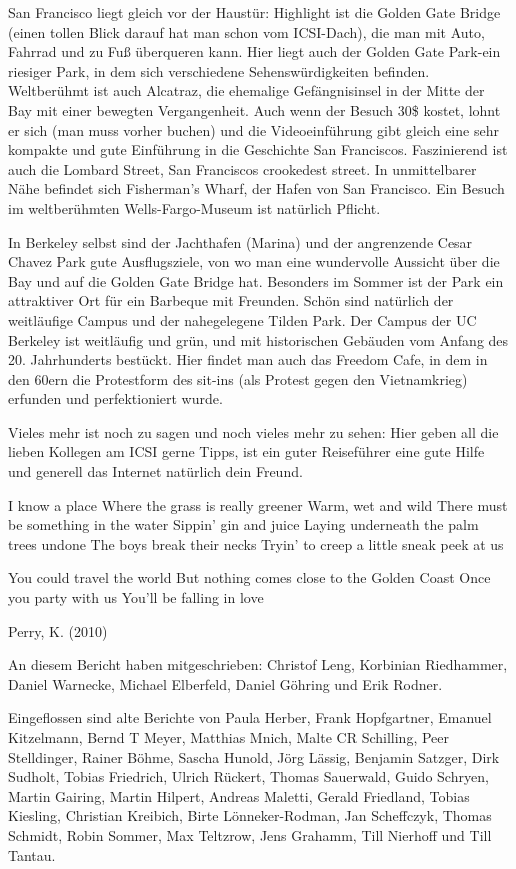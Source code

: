 \documentclass[a4paper]{scrreprt}
\begin{document}
San Francisco liegt gleich vor der Haustür: Highlight ist die Golden Gate Bridge (einen tollen Blick darauf hat man schon vom ICSI-Dach), die man mit Auto, Fahrrad und zu Fuß überqueren kann. Hier liegt auch der Golden Gate Park-ein riesiger Park, in dem sich verschiedene Sehenswürdigkeiten befinden. Weltberühmt ist auch Alcatraz, die ehemalige Gefängnisinsel in der Mitte der Bay mit einer bewegten Vergangenheit. Auch wenn der Besuch 30\$ kostet, lohnt er sich (man muss vorher buchen) und die Videoeinführung gibt gleich eine sehr kompakte und gute Einführung in die Geschichte San Franciscos. Faszinierend ist auch die Lombard Street, San Franciscos crookedest street. In unmittelbarer Nähe befindet sich Fisherman's Wharf, der Hafen von San Francisco. Ein Besuch im weltberühmten Wells-Fargo-Museum ist natürlich Pflicht.

In Berkeley selbst sind der Jachthafen (Marina) und der angrenzende Cesar Chavez Park gute Ausflugsziele, von wo man eine wundervolle Aussicht über die Bay und auf die Golden Gate Bridge hat. Besonders im Sommer ist der Park ein attraktiver Ort für ein Barbeque mit Freunden. Schön sind natürlich der weitläufige Campus und der nahegelegene Tilden Park. Der Campus der UC Berkeley ist weitläufig und grün, und mit historischen Gebäuden vom Anfang des 20. Jahrhunderts bestückt. Hier findet man auch das Freedom Cafe, in dem in den 60ern die Protestform des sit-ins (als Protest gegen den Vietnamkrieg) erfunden und perfektioniert wurde.

Vieles mehr ist noch zu sagen und noch vieles mehr zu sehen: Hier geben all die lieben Kollegen am ICSI gerne Tipps, ist ein guter Reiseführer eine gute Hilfe und generell das Internet natürlich dein Freund.

\clearpage

 


I know a place
Where the grass is really greener
Warm, wet and wild
There must be something in the water
Sippin' gin and juice
Laying underneath the palm trees undone
The boys break their necks
Tryin' to creep a little sneak peek at us

You could travel the world
But nothing comes close to the Golden Coast
Once you party with us
You'll be falling in love



Perry, K. (2010)

\clearpage

An diesem Bericht haben mitgeschrieben: Christof Leng, Korbinian Riedhammer, Daniel Warnecke, Michael Elberfeld, Daniel Göhring und Erik Rodner.

Eingeflossen sind alte Berichte von Paula Herber, Frank Hopfgartner, Emanuel Kitzelmann,
Bernd T Meyer, Matthias Mnich, Malte CR Schilling, Peer Stelldinger, Rainer Böhme, Sascha Hunold, Jörg Lässig, Benjamin Satzger, Dirk Sudholt, Tobias Friedrich, Ulrich Rückert, Thomas Sauerwald, Guido Schryen, Martin Gairing, Martin Hilpert, Andreas Maletti, Gerald Friedland, Tobias Kiesling, Christian Kreibich, Birte Lönneker-Rodman, Jan Scheffczyk,
Thomas Schmidt, Robin Sommer, Max Teltzrow, Jens Grahamm, Till Nierhoff und Till Tantau.
\end{document}
